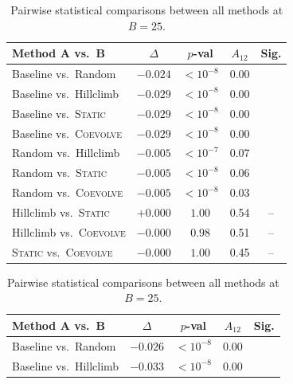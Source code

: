 \documentclass[conference]{IEEEtran}
\newcommand{\cmark}{\checkmark}
\begin{document}
\begin{table}[!t]
  \centering
  \renewcommand{\arraystretch}{1.12}
  \setlength{\tabcolsep}{4pt}
  \small
  \begin{minipage}[t]{0.48\linewidth}
    \centering
    \caption{Pairwise statistical comparisons between all methods at $B = 10$.}
    \label{tab:pairwise10}
    \begin{tabular}{lcccc}
      \toprule
      \textbf{Method A vs.\ B} & \textbf{$\Delta$} & \textbf{$p$-val} & \textbf{$A_{12}$} & \textbf{Sig.} \\
      \midrule
      Baseline vs.\ Random         & $-0.024$ & $<10^{-8}$ & 0.00 & \cmark \\
      Baseline vs.\ Hillclimb      & $-0.029$ & $<10^{-8}$ & 0.00 & \cmark \\
      Baseline vs.\ \textsc{Static}    & $-0.029$ & $<10^{-8}$ & 0.00 & \cmark \\
      Baseline vs.\ \textsc{Coevolve}  & $-0.029$ & $<10^{-8}$ & 0.00 & \cmark \\
      Random vs.\ Hillclimb        & $-0.005$ & $<10^{-7}$ & 0.07 & \cmark \\
      Random vs.\ \textsc{Static}      & $-0.005$ & $<10^{-8}$ & 0.06 & \cmark \\
      Random vs.\ \textsc{Coevolve}    & $-0.005$ & $<10^{-8}$ & 0.03 & \cmark \\
      Hillclimb vs.\ \textsc{Static}   & $+0.000$ & $1.00$     & 0.54 & -- \\
      Hillclimb vs.\ \textsc{Coevolve} & $-0.000$ & $0.98$     & 0.51 & -- \\
      \textsc{Static} vs.\ \textsc{Coevolve} & $-0.000$ & $1.00$ & 0.45 & -- \\
      \bottomrule
    \end{tabular}
  \end{minipage}
  \hfill
  \begin{minipage}[t]{0.48\linewidth}
    \centering
    \caption{Pairwise statistical comparisons between all methods at $B = 25$.}
    \label{tab:pairwise25}
    \begin{tabular}{lcccc}
      \toprule
      \textbf{Method A vs.\ B} & \textbf{$\Delta$} & \textbf{$p$-val} & \textbf{$A_{12}$} & \textbf{Sig.} \\
      \midrule
      Baseline vs.\ Random         & $-0.026$ & $<10^{-8}$ & 0.00 & \cmark \\
      Baseline vs.\ Hillclimb      & $-0.033$ & $<10^{-8}$ & 0.00 & \cmark \\

\end{tabular}
\end{minipage}
\end{table}
\end{document}
